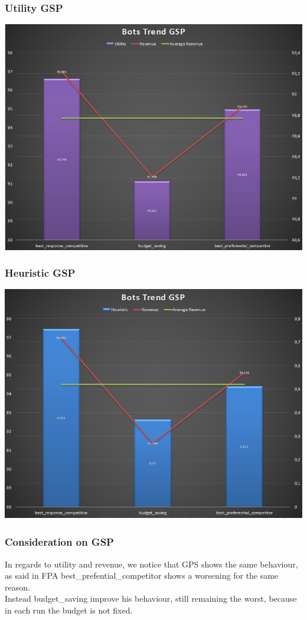 \documentclass{beamer}
\begin{document}
\begin{frame}
\frametitle{Utility GSP}
\begin{center}
\includegraphics[scale=0.46]{img/Auctions/RGSP_all_Utility.PNG} 
\end{center}
\end{frame}

\begin{frame}
\frametitle{Heuristic GSP}
\begin{center}
\includegraphics[scale=0.46]{img/Auctions/RGSP_all_Heuristic.PNG}
\end{center}
\end{frame}

\begin{frame}
\frametitle{Consideration on GSP}
In regards to utility and revenue, we notice that GPS shows the \alert{same} behaviour, as said in FPA best\_prefential\_competitor shows a \alert{worsening} for the same reason.\\
\medskip
Instead budget\_saving \alert{improve} his behaviour, still remaining the worst, because in each run the budget is not fixed.
\end{frame}
\end{document}
